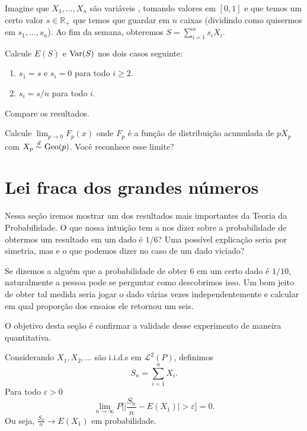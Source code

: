 \begin{exercise}
  Imagine que $X_1, \dots, X_n$ são variáveis \iid, tomando valores em $[0,1]$ e que temos um certo valor $s \in \mathbb{R}_+$ que temos que guardar em $n$ caixas (dividindo como quisermos em $s_1, \dots, s_n$).
  Ao fim da semana, obteremos $S =  \sum_{i=1}^n s_i X_i$.

  Calcule $E(S)$ e $\operatorname{Var}(S)$ nos dois casos seguinte:
  \begin{enumerate}[\quad a)]
  \item $s_1 = s$ e $s_i = 0$ para todo $i \geq 2$.
  \item $s_i = s/n$ para todo $i$.
  \end{enumerate}
  Compare os resultados.
\end{exercise}

\begin{exercise}
  Calcule $\lim_{p \to 0} F_p(x)$ onde $F_p$ é a função de distribuição acumulada de $p X_p$ com $X_p \overset{d}\sim \operatorname{Geo}(p)$.
  Você reconhece esse limite?
\end{exercise}

\section{Lei fraca dos grandes números}

Nessa seção iremos mostrar um dos resultados mais importantes da Teoria da Probabilidade.
O que nossa intuição tem a nos dizer sobre a probabilidade de obtermos um resultado em um dado é $1/6$?
Uma possível explicação seria por simetria, mas e o que podemos dizer no caso de um dado viciado?

Se dizemos a alguém que a probabilidade de obter $6$ em um certo dado é $1/10$, naturalmente a pessoa pode se perguntar como descobrimos isso.
Um bom jeito de obter tal medida seria jogar o dado várias vezes independentemente e calcular em qual proporção dos ensaios ele retornou um seis.

O objetivo desta seção é confirmar a validade desse experimento de maneira quantitativa.

\begin{theorem}
  \label{t:lei_fraca}
  Considerando $X_1, X_2, \dots$ são i.i.d.s em $\mathcal{L}^2(P)$, definimos
  \begin{equation}
    S_n = \sum_{i=1}^n X_i.
  \end{equation}
  Para todo $\varepsilon > 0$
  \begin{equation}
    \lim_{n \to \infty} P \Big[\Big| \frac{S_n}{n} - E(X_1)\Big| > \varepsilon \Big] = 0.
  \end{equation}
  Ou seja, $\tfrac{S_n}{n} \to E(X_1)$ em probabilidade.
\end{theorem}



